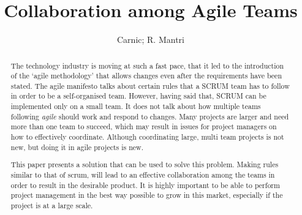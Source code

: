 \documentclass[sigconf]{acmart}
\begin{document}
%
\title{Collaboration among Agile Teams}

%
\author{Carnic; R. Mantri }

%
\begin{abstract}
The technology industry is moving at such a fast pace, that it led to the introduction of the ‘agile methodology’ that allows changes even after the requirements have been stated. The agile manifesto talks about certain rules that a SCRUM team has to follow in order to be a self-organised team. However, having said that, SCRUM can be implemented only on a small team. It does not talk about how multiple teams following \textit {agile} should work and respond to changes. Many projects are larger and need more than one team to succeed, which may result in issues for project managers on how to effectively coordinate. Although coordinating large, multi team projects is not new, but doing it in agile projects is new. 


This paper presents a solution that can be used to solve this problem. Making rules similar to that of scrum, will lead to an effective collaboration among the teams in order to result in the desirable product. It is highly important to be able to perform project management in the best way possible to grow in this market, especially if the project is at a large scale.
\end{abstract}


%

%


%
\maketitle
\end{document}
